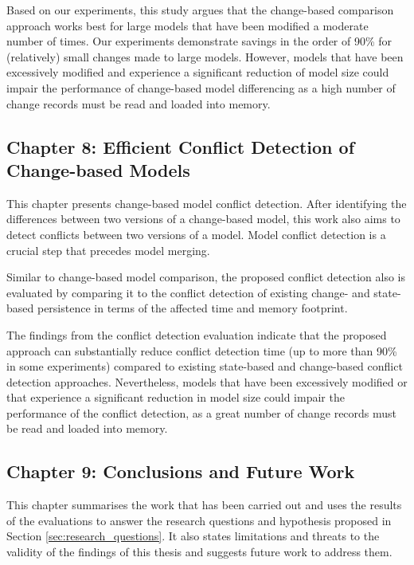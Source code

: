 Based on our experiments, this study argues that the change-based comparison approach works best for large models that have been modified a moderate number of times. Our experiments demonstrate savings in the order of 90\% for (relatively) small changes made to large models. However, models that have been excessively modified and experience a significant reduction of model size could impair the performance of change-based model differencing as a high number of change records must be read and loaded into memory.

\subsection{Chapter 8: Efficient Conflict Detection of Change-based Models}
\label{sec:chapter_7_conflict_detection}
This chapter presents change-based model conflict detection. After identifying the differences between two versions of a change-based model, this work also aims to detect conflicts between two versions of a model. Model conflict detection is a crucial step that precedes model merging.

Similar to change-based model comparison, the proposed conflict detection also is evaluated by comparing it to the conflict detection of existing change- and state-based persistence in terms of the affected time and memory footprint.

The findings from the conflict detection evaluation indicate that the proposed approach can substantially reduce conflict detection time (up to more than 90\% in some experiments) compared to existing state-based and change-based conflict detection approaches. Nevertheless, models that have been excessively modified or that experience a significant reduction in model size could impair the performance of the conflict detection, as a great number of change records must be read and loaded into memory.

\subsection{Chapter 9: Conclusions and Future Work}
\label{sec:chapter_8_conclusions_and_future_work}
This chapter summarises the work that has been carried out and uses the results of the evaluations to answer the research questions and hypothesis proposed in Section \ref{sec:research_questions}. It also states limitations and threats to the validity of the findings of this thesis and suggests future work to address them.

